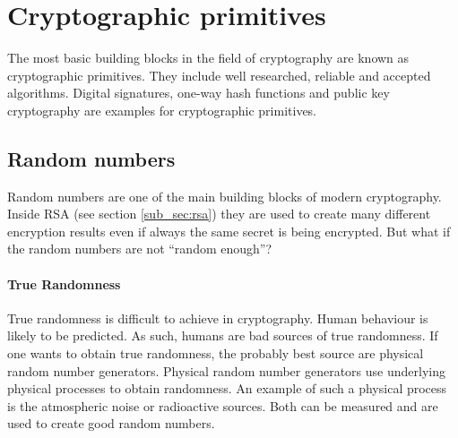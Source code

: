 \section{Cryptographic primitives}

The most basic building blocks in the field of cryptography are known as
cryptographic primitives. They include well researched, reliable and accepted
algorithms. Digital signatures, one-way hash functions and public key
cryptography are examples for cryptographic primitives.

\subsection{Random numbers}

Random numbers are one of the main building blocks of modern cryptography.
Inside RSA (see section \ref{sub_sec:rsa}) they are used to create many
different encryption results even if always the same secret is being encrypted.
But what if the random numbers are not ``random enough''?

\paragraph{True Randomness}
True randomness is difficult to achieve in cryptography. Human behaviour
is likely to be predicted. As such, humans are bad sources of true randomness.
If one wants to obtain true randomness, the probably best source are physical
random number generators. Physical random number generators use underlying
physical processes to obtain randomness. An example of such a physical process
is the atmospheric noise or radioactive sources. Both can be measured and
are used to create good random numbers.

